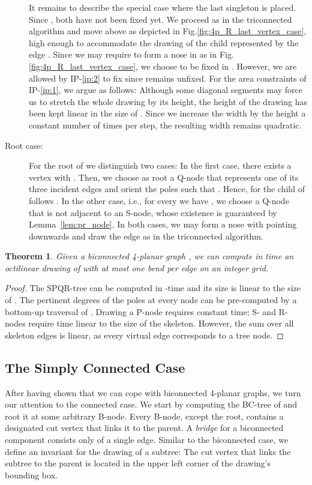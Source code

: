 \documentclass[a4paper,twoside,11pt]{article}
\newtheorem{theorem}{Theorem}
\newcommand{\IPGeo}{IP-\ref{ip:1}\xspace}
\newcommand{\IPFix}{IP-\ref{ip:2}\xspace}
\begin{document}
\begin{description}
It remains to describe the special case where the last singleton
 is placed. Since , both have not been
fixed yet. We proceed as in the triconnected algorithm and move  above  as depicted in Fig.\ref{fig:4p_R_last_vertex_case},
high enough to accommodate the drawing of the child 
represented by the edge . Since we may require  to
form a nose in  as in Fig.\ref{fig:4p_R_last_vertex_case},
we choose  to be fixed in . However, we are allowed by
\IPFix to fix  since  remains unfixed. For the area
constraints of \IPGeo, we argue as follows: Although some diagonal
segments may force us to stretch the whole drawing by its height,
the height of the drawing has been kept linear in the size of
. Since we increase the width by the height a constant
number of times per step, the resulting width remains quadratic.
\item[Root case:] For the root of  we distinguish two cases:
In the first case, there exists a vertex  with . Then, we choose as root a Q-node  that represents one
of its three incident edges and orient the poles  such that
. Hence, for the child  of  follows
. In the other case, i.e., for every  we have , we choose a Q-node that is not adjacent to
an S-node, whose existence is guaranteed by Lemma~\ref{lem:pr_node}.
In both cases, we may form a nose with  pointing downwards and
draw the edge as in the triconnected algorithm.
\end{description}

\begin{theorem}
Given a biconnected 4-planar graph , we can compute in 
time an octilinear drawing of  with at most one bend per edge on
an  integer grid.
\end{theorem}
\begin{proof}
The SPQR-tree  can be computed in -time and its
size is linear to the size of  \cite{GM00}. The pertinent degrees
of the poles at every node can be pre-computed by a bottom-up
traversal of . Drawing a P-node requires constant time;
S- and R-nodes require time linear to the size of the skeleton.
However, the sum over all skeleton edges is linear, as every virtual
edge corresponds to a tree node.
\end{proof}

\subsection{The Simply Connected Case}
\label{sec:4con}
After having shown that we can cope with biconnected 4-planar
graphs, we turn our attention to the connected case. We start by
computing the BC-tree of  and root it at some arbitrary B-node.
Every B-node, except the root, contains a designated cut vertex that
links it to the parent. A \emph{bridge} for a biconnected component
consists only of a single edge. Similar to the biconnected case, we
define an invariant for the drawing of a subtree: The cut vertex
that links the subtree to the parent is located in the upper left
corner of the drawing's bounding box.
\end{document}
